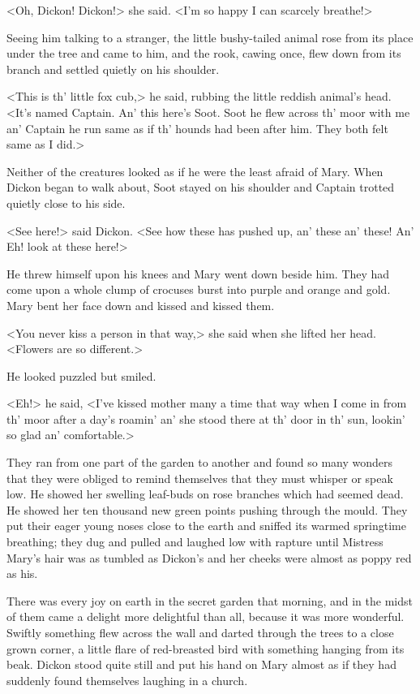 <Oh, Dickon! Dickon!> she said. <I'm so happy I can scarcely breathe!>

Seeing him talking to a stranger, the little bushy-tailed animal rose from its place under the tree and came to him, and the rook, cawing once, flew down from its branch and settled quietly on his shoulder.

<This is th' little fox cub,> he said, rubbing the little reddish animal's head. <It's named Captain. An' this here's Soot. Soot he flew across th' moor with me an' Captain he run same as if th' hounds had been after him. They both felt same as I did.>

Neither of the creatures looked as if he were the least afraid of Mary. When Dickon began to walk about, Soot stayed on his shoulder and Captain trotted quietly close to his side.

<See here!> said Dickon. <See how these has pushed up, an' these an' these! An' Eh! look at these here!>

He threw himself upon his knees and Mary went down beside him. They had come upon a whole clump of crocuses burst into purple and orange and gold. Mary bent her face down and kissed and kissed them.

<You never kiss a person in that way,> she said when she lifted her head. <Flowers are so different.>

He looked puzzled but smiled.

<Eh!> he said, <I've kissed mother many a time that way when I come in from th' moor after a day's roamin' an' she stood there at th' door in th' sun, lookin' so glad an' comfortable.>

They ran from one part of the garden to another and found so many wonders that they were obliged to remind themselves that they must whisper or speak low. He showed her swelling leaf-buds on rose branches which had seemed dead. He showed her ten thousand new green points pushing through the mould. They put their eager young noses close to the earth and sniffed its warmed springtime breathing; they dug and pulled and laughed low with rapture until Mistress Mary's hair was as tumbled as Dickon's and her cheeks were almost as poppy red as his.

There was every joy on earth in the secret garden that morning, and in the midst of them came a delight more delightful than all, because it was more wonderful. Swiftly something flew across the wall and darted through the trees to a close grown corner, a little flare of red-breasted bird with something hanging from its beak. Dickon stood quite still and put his hand on Mary almost as if they had suddenly found themselves laughing in a church.

